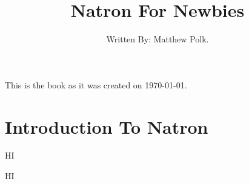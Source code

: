\documentclass[oneside]{scrbook}
\title{Natron For Newbies}
\author{Written By: Matthew Polk.}
\date{}
\begin{document}
\maketitle

This is the book as it was created on \today.

\pagestyle{empty}

\tableofcontents


\chapter{Introduction To Natron}
\setcounter{page}{1}
\pagestyle{plain}
HI

\newpage
HI
\end{document}
